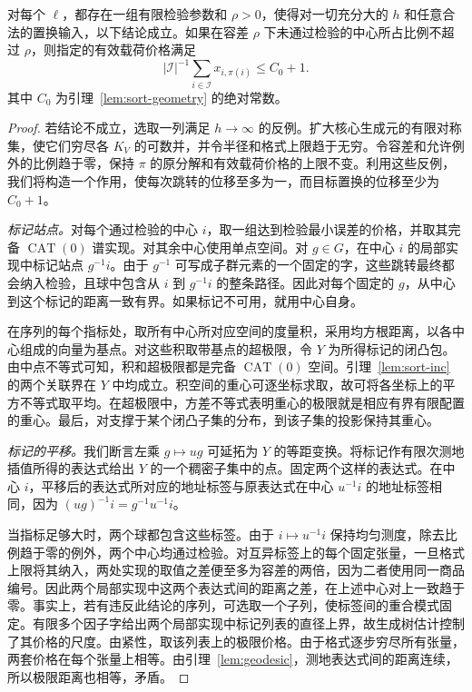 \begin{lemma}[有限检测]\label{lem:sort-local-tests} 对每个 $\ell$，都存在一组有限检验参数和 $\rho>0$，使得对一切充分大的 $h$ 和任意合法的置换输入，以下结论成立。如果在容差 $\rho$ 下未通过检验的中心所占比例不超过 $\rho$，则指定的有效载荷价格满足 \[
        |\mathcal I|^{-1}\sum_{i\in\mathcal I} x_{i,\pi(i)}
                  \le C_0+1 .
\] 其中 $C_0$ 为引理~\ref{lem:sort-geometry} 的绝对常数。\end{lemma}

\begin{proof} 若结论不成立，选取一列满足 $h\to\infty$ 的反例。扩大核心生成元的有限对称集，使它们穷尽各 $K_V$ 的可数并，并令半径和格式上限趋于无穷。令容差和允许例外的比例趋于零，保持 $\pi$ 的原分解和有效载荷价格的上限不变。利用这些反例，我们将构造一个作用，使每次跳转的位移至多为一，而目标置换的位移至少为 $C_0+1$。

\smallskip\noindent \emph{标记站点。}对每个通过检验的中心 $i$，取一组达到检验最小误差的价格，并取其完备 $\operatorname{CAT}(0)$ 谱实现。对其余中心使用单点空间。对 $g\in G$，在中心 $i$ 的局部实现中标记站点 $g^{-1}i$。由于 $g^{-1}$ 可写成子群元素的一个固定的字，这些跳转最终都会纳入检验，且球中包含从 $i$ 到 $g^{-1}i$ 的整条路径。因此对每个固定的 $g$，从中心到这个标记的距离一致有界。如果标记不可用，就用中心自身。

在序列的每个指标处，取所有中心所对应空间的度量积，采用均方根距离，以各中心组成的向量为基点。对这些积取带基点的超极限，令 $Y$ 为所得标记的闭凸包。由中点不等式可知，积和超极限都是完备 $\operatorname{CAT}(0)$ 空间。引理~\ref{lem:sort-inc} 的两个关联界在 $Y$ 中均成立。积空间的重心可逐坐标求取，故可将各坐标上的平方不等式取平均。在超极限中，方差不等式表明重心的极限就是相应有界有限配置的重心。最后，对支撑于某个闭凸子集的分布，到该子集的投影保持其重心。

\smallskip\noindent \emph{标记的平移。}我们断言左乘 $g\mapsto ug$ 可延拓为 $Y$ 的等距变换。将标记作有限次测地插值所得的表达式给出 $Y$ 的一个稠密子集中的点。固定两个这样的表达式。在中心 $i$，平移后的表达式所对应的地址标签与原表达式在中心 $u^{-1}i$ 的地址标签相同，因为 $(ug)^{-1}i=g^{-1}u^{-1}i$。

当指标足够大时，两个球都包含这些标签。由于 $i\mapsto u^{-1}i$ 保持均匀测度，除去比例趋于零的例外，两个中心均通过检验。对互异标签上的每个固定张量，一旦格式上限将其纳入，两处实现的取值之差便至多为容差的两倍，因为二者使用同一商品编号。因此两个局部实现中这两个表达式间的距离之差，在上述中心对上一致趋于零。事实上，若有违反此结论的序列，可选取一个子列，使标签间的重合模式固定。有限多个因子字给出两个局部实现中标记列表的直径上界，故生成树估计控制了其价格的尺度。由紧性，取该列表上的极限价格。由于格式逐步穷尽所有张量，两套价格在每个张量上相等。由引理~\ref{lem:geodesic}，测地表达式间的距离连续，所以极限距离也相等，矛盾。


\end{proof}
